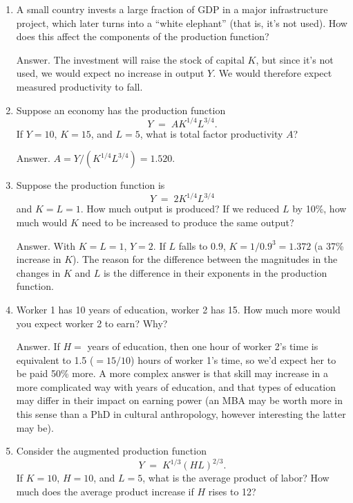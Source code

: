 \documentclass[letterpaper,12pt]{article}
\begin{document}
\begin{enumerate}

\item A small country invests a large fraction of GDP in a major
infrastructure project, which later turns into a ``white elephant''
(that is, it's not used).
How does this affect the components of the
production function?

Answer.
The investment will raise the stock of capital $K$,
but since it's not used, we would expect no increase in output $Y$.
We would therefore expect measured productivity to fall.

\item Suppose an economy has the production function
\[
    Y \;=\; A K^{1/4} L^{3/4} .
\]
If $ Y= 10$, $K=15$, and $L = 5$,
what is total factor productivity $A$?

Answer.  $ A = Y / (K^{1/4} L^{3/4}) = 1.520$.



\item Suppose the production function is
\[
    Y \;=\; 2 K^{1/4} L^{3/4}
\]
and $K=L = 1$. How much output is produced? If we reduced $L$ by
10\%, how much would $K$ need to be increased to produce the same
output?

Answer.  With $K=L=1$, $Y = 2$.
If $L$ falls to $0.9$, $K = 1/0.9^3 = 1.372$
(a 37\% increase in $K$).
The reason for the difference between the magnitudes in the changes in
$K$ and $L$ is the difference in their exponents in the production function.


\item Worker 1 has 10 years of education, worker 2 has 15.  How much
more would you expect worker 2 to earn?  Why?

Answer.  If $H = $ years of education, then one hour of worker 2's
time is equivalent to 1.5 ($=15/10$) hours of worker 1's time, so
we'd expect her to be paid 50\% more. A more complex answer is
that skill may increase in a more complicated way with years of
education, and that types of education may differ in their impact
on earning power (an MBA may be worth more in this sense than a
PhD in cultural anthropology, however interesting the latter may
be).

\item Consider the augmented production function
\[
    Y \;=\;  K^{1/3} (HL)^{2/3} .
\]
If $K=10$, $H=10$, and $L=5$, what is the average product of labor?
How much does the average product increase if $H$ rises to 12?


\end{enumerate}
\end{document}
